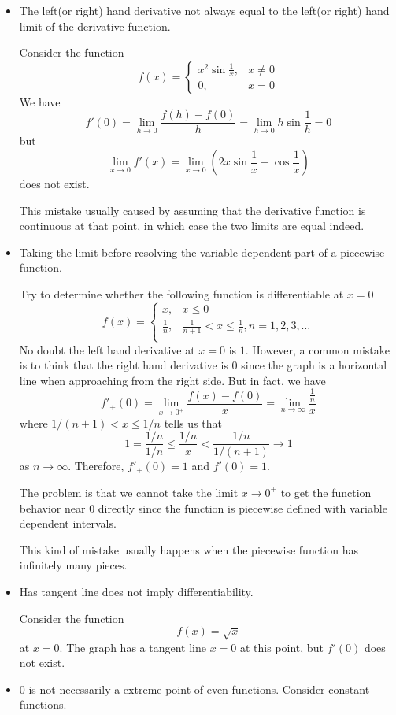 \documentclass{overview}
\begin{document}
\begin{itemize}
	\item The left(or right) hand derivative not always equal to the left(or right) 
		hand limit of the derivative function. 

		\begin{example}
			Consider the function
			\[
				f(x) = \begin{cases}
					x^2\sin\frac{1}{x}, & x \neq 0 \\
					0, & x = 0
				\end{cases}
			\]
			We have
			\[
				f'(0) = \lim_{h \to 0} \frac{f(h) - f(0)}{h} = \lim_{h \to 0} h \sin\frac{1}{h} = 0
			\]
			but
			\[
				\lim_{x \to 0} f'(x) = \lim_{x \to 0} \left( 2x\sin\frac{1}{x} - \cos\frac{1}{x} \right)
			\]
			does not exist.
		\begin{remark}
		This mistake usually caused by assuming that the derivative function is
		continuous at that point, in which case the two limits are equal indeed.
		\end{remark}
		\end{example}
	\item Taking the limit before resolving the variable dependent part of a piecewise
		function.
		\begin{example}
			Try to determine whether the following function is differentiable at
			$x = 0$
			\[
				f(x) = \begin{cases}
					x, & x \leq 0 \\
					\frac{1}{n}, & \frac{1}{n+1} < x \leq \frac{1}{n}, n = 1,2,3,\ldots \\
				\end{cases}
			\]
			No doubt the left hand derivative at $x = 0$ is $1$. However,
			a common mistake is to think that the right hand derivative is $0$ since
			the graph is a horizontal line when approaching from the right side.
			But in fact, we have
			\[
				f'_{+}(0) = \lim_{x \to 0^{+}} \frac{f(x) - f(0)}{x} =
				\lim_{n \to \infty} \frac{\frac{1}{n}}{x}
			\] 
			where $1 / (n+1) < x \leq 1/n$ tells us that
			\[
				1= \frac{1 / n}{1 / n} \leq \frac{1 / n}{x} < \frac{1 / n}{1 / (n+1)}
				\to 1
			\] 
			as $n \to \infty$. Therefore, $f'_{+}(0) = 1$ and $f'(0) = 1$.
			
			The problem is that we cannot take the limit $x \to 0^{+}$ to get
			the function behavior near $0$ directly since the function is piecewise defined
			with variable dependent intervals.
			\begin{remark}
			This kind of mistake usually happens when the piecewise function has infinitely
			many pieces.
			\end{remark}
		\end{example}
	\item Has tangent line does not imply differentiability.
		\begin{example}
			Consider the function
			\[
				f(x) = \sqrt{x}
			\]
			at $x = 0$. The graph has a tangent line $x = 0$ at this point, but
			$f'(0)$ does not exist.
		\end{example}
	\item 0 is not necessarily a extreme point of even functions.
		Consider constant functions.
\end{itemize}
\end{document}
